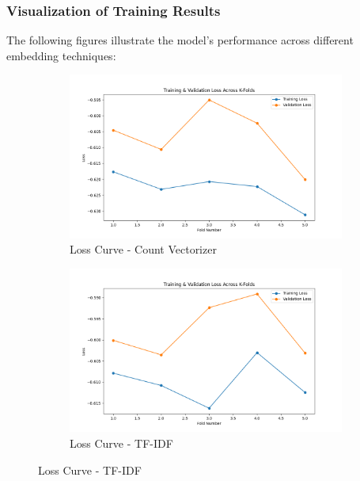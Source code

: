 \subsubsection{Visualization of Training Results}
The following figures illustrate the model’s performance across different embedding techniques:

\begin{figure}[H]
    \centering
    \begin{subfigure}[b]{0.44\textwidth}
        \includegraphics[width=\textwidth]{img/report_info/img/1.2.DecisionTree/best_decision_tree_count_loss.png}
        \caption{Loss Curve - Count Vectorizer}
        \label{fig:lr-count-loss}
    \end{subfigure}
    \begin{subfigure}[b]{0.44\textwidth}
        \includegraphics[width=\textwidth]{img/report_info/img/1.2.DecisionTree/best_decision_tree_tfidf_loss.png}
        \caption{Loss Curve - TF-IDF}
        \label{fig:lr-tfidf-loss}
    \end{subfigure}
    

\end{figure}
